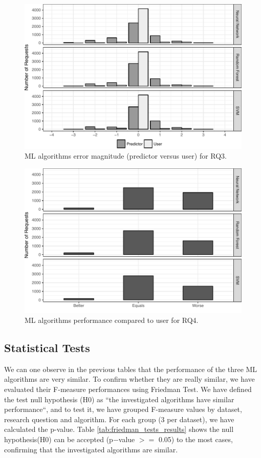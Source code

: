 \begin{figure}[!ht]
\centering
  \includegraphics[scale=1]{figures/predictor_vs_user_error_magnitude.pdf}
  \caption{ML algorithms error magnitude (predictor versus user) for RQ3.}
    \label{fig:classifiers_performance_for_q3}
\end{figure}

\begin{figure}[!ht]
\centering
  \includegraphics[scale=1]{figures/predictors_performance_compared_user.pdf}
  \caption{ML algorithms performance compared to user for RQ4.}
    \label{fig:classifiers_performance_for_q4}
\end{figure}

\subsection{Statistical Tests}\label{subsec:tests}
We can one observe in the previous tables that the performance of the three ML algorithms are very similar. To confirm whether they are really similar, we have evaluated their F-measure performances using Friedman Test\cite{Japkowicz:2011}. 
We have defined the test null hypothesis (H0) as ``the investigated algorithms have similar performance``, and to test it, we have grouped F-measure values by dataset, research question and algorithm. For each group (3 per dataset), we have calculated the p-value.    Table \ref{tab:friedman_tests_results} shows the null hypothesis(H0) can be accepted (p$-$value $>=$ 0.05) to the most cases, confirming that the investigated algorithms are similar\cite{Demsar:2006}. 

